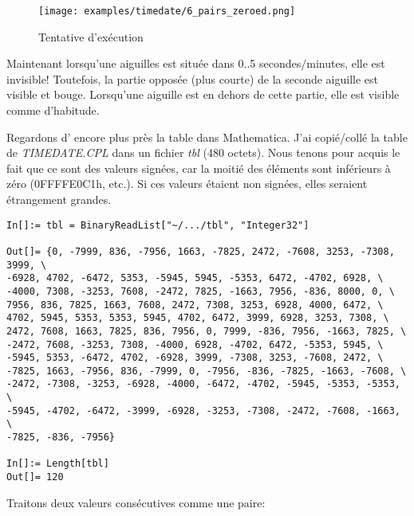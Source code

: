 \begin{figure}[H]
\centering
\texttt{[image: examples/timedate/6\_pairs\_zeroed.png]}
\caption{Tentative d'exécution}
\end{figure}

Maintenant lorsqu'une aiguilles est située dans 0..5 secondes/minutes, elle est invisible!
Toutefois, la partie opposée (plus courte) de la seconde aiguille est visible et
bouge.
Lorsqu'une aiguille est en dehors de cette partie, elle est visible comme d'habitude.

Regardons d' encore plus près la table dans Mathematica.
J'ai copié/collé la table de \emph{TIMEDATE.CPL} dans un fichier \emph{tbl} (480 octets).
Nous tenons pour acquis le fait que ce sont des valeurs signées, car la moitié des
éléments sont inférieurs à zéro (0FFFFE0C1h, etc.).
Si ces valeurs étaient non signées, elles seraient étrangement grandes.

\begin{lstlisting}[style=custommath]
In[]:= tbl = BinaryReadList["~/.../tbl", "Integer32"]

Out[]= {0, -7999, 836, -7956, 1663, -7825, 2472, -7608, 3253, -7308, 3999, \
-6928, 4702, -6472, 5353, -5945, 5945, -5353, 6472, -4702, 6928, \
-4000, 7308, -3253, 7608, -2472, 7825, -1663, 7956, -836, 8000, 0, \
7956, 836, 7825, 1663, 7608, 2472, 7308, 3253, 6928, 4000, 6472, \
4702, 5945, 5353, 5353, 5945, 4702, 6472, 3999, 6928, 3253, 7308, \
2472, 7608, 1663, 7825, 836, 7956, 0, 7999, -836, 7956, -1663, 7825, \
-2472, 7608, -3253, 7308, -4000, 6928, -4702, 6472, -5353, 5945, \
-5945, 5353, -6472, 4702, -6928, 3999, -7308, 3253, -7608, 2472, \
-7825, 1663, -7956, 836, -7999, 0, -7956, -836, -7825, -1663, -7608, \
-2472, -7308, -3253, -6928, -4000, -6472, -4702, -5945, -5353, -5353, \
-5945, -4702, -6472, -3999, -6928, -3253, -7308, -2472, -7608, -1663, \
-7825, -836, -7956}

In[]:= Length[tbl]
Out[]= 120
\end{lstlisting}

Traitons deux valeurs consécutives comme une paire:

